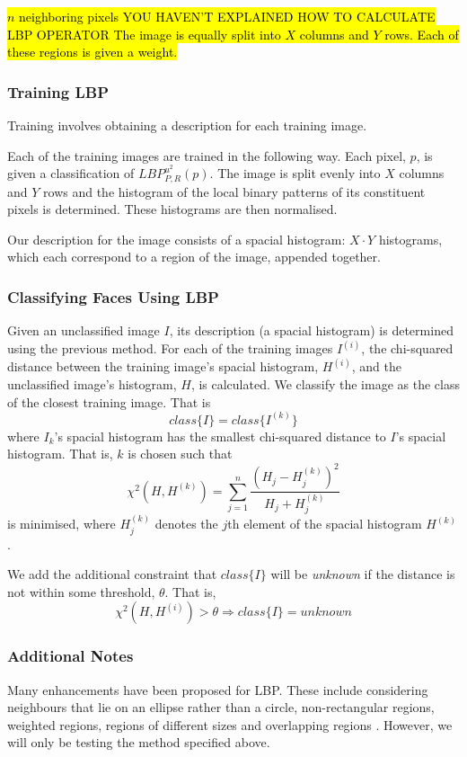 \documentclass{article}
\begin{document}
\hl{$n$ neighboring pixels 
YOU HAVEN'T EXPLAINED HOW TO CALCULATE LBP OPERATOR
The image is equally split into $X$ columns and $Y$ rows. Each of these regions is given a weight.}
\subsubsection{Training LBP}
Training involves obtaining a description for each training image.

Each of the training images are trained in the following way. Each pixel, $p$, is given a classification of $LBP_{P,R}^{u^2}(p)$. The image is split evenly into $X$ columns and $Y$ rows and the histogram of the local binary patterns of its constituent pixels is determined. These histograms are then normalised.

Our description for the image consists of a spacial histogram: $X\cdot Y$ histograms, which each correspond to a region of the image, appended together.

\subsubsection{Classifying Faces Using LBP}
Given an unclassified image $I$, its description (a spacial histogram) is determined using the previous method. For each of the training images $I^{(i)}$, the chi-squared distance between the training image's spacial histogram, $H^{(i)}$, and the unclassified image's histogram, $H$, is calculated.
We classify the image as the class of the closest training image. That is
\begin{equation}
	class\{I\} = class\{I^{(k)}\}
\end{equation}
where $I_k$'s spacial histogram has the smallest chi-squared distance to $I$'s spacial histogram. That is, $k$ is chosen such that
\begin{equation}
	\chi^2(H, H^{(k)}) = \sum_{j=1}^{n}\frac{(H_j - H^{(k)}_j)^2}{H_j + H^{(k)}_j}
\end{equation}
is minimised, where $H^{(k)}_j$ denotes the $j$th element of the spacial histogram $H^{(k)}$.

We add the additional constraint that $class\{I\}$ will be \textit{unknown} if the distance is not within some threshold, $\theta$. That is,
\begin{equation}
	\chi^2(H, H^{(i)}) > \theta \Rightarrow class\{I\} = unknown
\end{equation}

\subsubsection{Additional Notes}
Many enhancements have been proposed for LBP. These include considering neighbours that lie on an ellipse rather than a circle, non-rectangular regions, weighted regions, regions of different sizes and overlapping regions \cite{belhumeur1997eigenfaces}. However, we will only be testing the method specified above.
\end{document}
